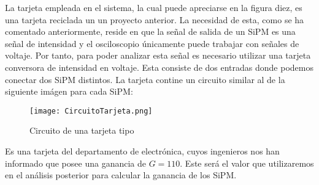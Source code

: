 La tarjeta empleada en el sistema, la cual puede apreciarse en la figura diez, es una tarjeta reciclada un un proyecto anterior. La necesidad de esta, como se ha comentado anteriormente, reside en que la señal de salida de un SiPM es una señal de intensidad y el osciloscopio únicamente puede trabajar con señales de voltaje. Por tanto, para poder analizar esta señal es necesario utilizar una tarjeta conversora de intensidad en voltaje. Esta consiste de dos entradas donde podemos conectar dos SiPM distintos. La tarjeta contine un circuito similar al de la siguiente imágen para cada SiPM:

\begin{figure}[hbtp]
\centering
\texttt{[image: CircuitoTarjeta.png]}
\caption{ Circuito de una tarjeta tipo}
\end{figure}


Es una tarjeta del departamento de electrónica, cuyos ingenieros nos han informado que posee una ganancia de $G=110$. Este será el valor que utilizaremos en el análisis posterior para calcular la ganancia de los SiPM.

